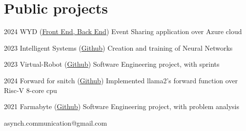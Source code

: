 \documentclass{tccv}
\begin{document}
\section{Public projects}

\begin{yearlist}
    \item{2024}
    {WYD (\href{https://github.com/RedDuality/WYD/tree/main/frontend/wyd_front}{Front End, } \href{https://github.com/RedDuality/WYD_back}{Back End})}
    {Event Sharing application over Azure cloud}
    \item{2023}
    {Intelligent Systems (\href{https://github.com/RedDuality/IntelligentSystems}{Github})}
    {Creation and training of Neural Networks}
    \item{2023}
          {Virtual-Robot (\href{https://github.com/RedDuality/issLab23}{Github})}
          {Software Engineering project, with sprints}
    \item{2024}
    {Forward for snitch (\href{https://github.com/RedDuality/snitch_forward}{Github})}
    {Implemented llama2's forward function over Risc-V 8-core cpu}
    \item{2021}
          {Farmabyte (\href{https://github.com/lorenzo9uerra/farmabyte-doc} {Github})}
          {Software Engineering project, with problem analysis}
\end{yearlist}


{asynch.communication@gmail.com}
{}
\end{document}
